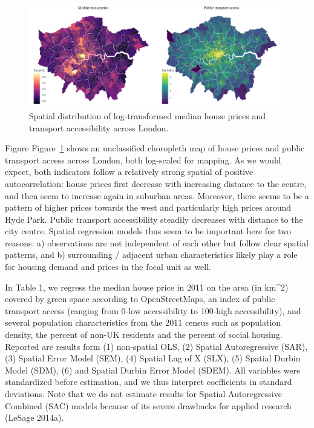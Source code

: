 \documentclass[
  letterpaper,
  DIV=11,
  numbers=noendperiod]{scrreprt}
\begin{document}
\begin{figure}

{\centering \includegraphics{fig/Maps.jpeg}

}

\caption{\label{fig-map}Spatial distribution of log-transformed median
house prices and transport accessibility across London.}

\end{figure}

Figure Figure~\ref{fig-map} shows an unclassified choropleth map of
house prices and public transport access across London, both log-scaled
for mapping. As we would expect, both indicators follow a relatively
strong spatial of positive autocorrelation: house prices first decrease
with increasing distance to the centre, and then seem to increase again
in suburban areas. Moreover, there seems to be a pattern of higher
prices towards the west and particularly high prices around Hyde Park.
Public transport accessibility steadily decreases with distance to the
city centre. Spatial regression models thus seem to be important here
for two reasons: a) observations are not independent of each other but
follow clear spatial patterns, and b) surrounding / adjacent urban
characteristics likely play a role for housing demand and prices in the
focal unit as well.

In Table 1, we regress the median house price in 2011 on the area (in
km\^{}2) covered by green space according to OpenStreetMaps, an index of
public transport access (ranging from 0-low accessibility to 100-high
accessibility), and several population characteristics from the 2011
census such as population density, the percent of non-UK residents and
the percent of social housing. Reported are results form (1) non-spatial
OLS, (2) Spatial Autoregressive (SAR), (3) Spatial Error Model (SEM),
(4) Spatial Lag of X (SLX), (5) Spatial Durbin Model (SDM), (6) and
Spatial Durbin Error Model (SDEM). All variables were standardized
before estimation, and we thus interpret coefficients in standard
deviations. Note that we do not estimate results for Spatial
Autoregressive Combined (SAC) models because of its severe drawbacks for
applied research (LeSage 2014a).
\end{document}
